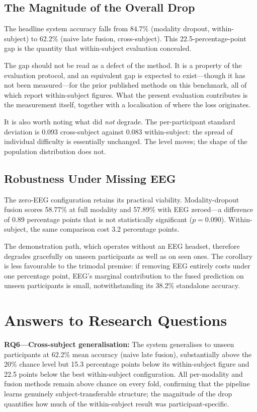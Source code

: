\subsection{The Magnitude of the Overall Drop}

The headline system accuracy falls from 84.7\% (modality dropout, within-subject) to
62.2\% (naive late fusion, cross-subject). This 22.5-percentage-point gap is the
quantity that within-subject evaluation concealed.

The gap should not be read as a defect of the method. It is a property of the
evaluation protocol, and an equivalent gap is expected to exist---though it has not
been measured---for the prior published methods on this benchmark, all of which report
within-subject figures. What the present evaluation contributes is the measurement
itself, together with a localisation of where the loss originates.

It is also worth noting what did \emph{not} degrade. The per-participant standard
deviation is 0.093 cross-subject against 0.083 within-subject: the spread of
individual difficulty is essentially unchanged. The level moves; the shape of the
population distribution does not.

\subsection{Robustness Under Missing EEG}

The zero-EEG configuration retains its practical viability. Modality-dropout fusion
scores 58.77\% at full modality and 57.89\% with EEG zeroed---a difference of 0.89
percentage points that is not statistically significant ($p = 0.090$). Within-subject,
the same comparison cost 3.2 percentage points.

The demonstration path, which operates without an EEG headset, therefore degrades
gracefully on unseen participants as well as on seen ones. The corollary is less
favourable to the trimodal premise: if removing EEG entirely costs under one
percentage point, EEG's marginal contribution to the fused prediction on unseen
participants is small, notwithstanding its 38.2\% standalone accuracy.

\section{Answers to Research Questions}
\label{sec:cs_rq}

\textbf{RQ6---Cross-subject generalisation:} The system generalises to unseen
participants at 62.2\% mean accuracy (naive late fusion), substantially above the
20\% chance level but 15.3 percentage points below its within-subject figure and 22.5
points below the best within-subject configuration. All per-modality and fusion
methods remain above chance on every fold, confirming that the pipeline learns
genuinely subject-transferable structure; the magnitude of the drop quantifies how
much of the within-subject result was participant-specific.


